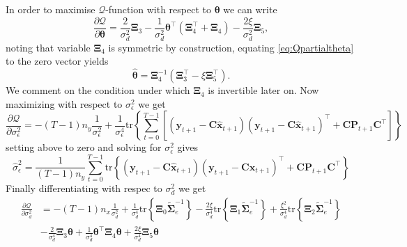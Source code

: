 \documentclass[]{article}
\begin{document}
In order to maximise $\mathcal{Q}$-function with respect to $\boldsymbol\theta$ we can write
\begin{equation}\label{eq:Qpartialtheta}
 \frac{\partial \mathcal Q}{\partial \boldsymbol\theta}=\frac{2}{\sigma_d^2}\boldsymbol\Xi_3-\frac{1}{\sigma_d^2}\boldsymbol\theta^\top(\boldsymbol\Xi_4^\top+\boldsymbol\Xi_4)-\frac{2\xi}{\sigma_d^2}\boldsymbol\Xi_5,
\end{equation}
noting that variable $\boldsymbol\Xi_4$ is symmetric by construction, equating \eqref{eq:Qpartialtheta} to the zero vector yields
\begin{equation}\label{eq:theta}
 \hat{\boldsymbol \theta}=\boldsymbol\Xi_4^{-1}\left(\boldsymbol\Xi_3^\top-\xi\boldsymbol\Xi_5^\top \right).
\end{equation}
We comment on the condition under which $\boldsymbol\Xi_4$ is invertible later on. Now maximizing with respect to $\sigma_{\epsilon}^2$ we get
\begin{equation}
  \frac{\partial \mathcal Q}{\partial \sigma_{\epsilon}^2}=-(T-1)n_y\frac{1}{\sigma_{\epsilon}^2}+\frac{1}{\sigma_{\epsilon}^4}\mathrm{tr}\left\lbrace\sum_{t=0}^{T-1}\left[ (\mathbf y_{t+1}-\mathbf C\mathbf{\hat{x}}_{t+1}) (\mathbf y_{t+1}-\mathbf C\mathbf{\hat{x}}_{t+1})^\top+\mathbf C \mathbf P_{t+1}\mathbf C^\top\right] \right\rbrace
\end{equation}
setting above to zero and solving for $\sigma_{\epsilon}^2$ gives
\begin{equation}
 \hat{\sigma}_{\epsilon}^2=\frac{1}{(T-1)n_y}\sum_{t=0}^{T-1}\mathrm{tr}\left\lbrace (\mathbf y_{t+1}-\mathbf C\mathbf{\hat{x}}_{t+1}) (\mathbf y_{t+1}-\mathbf C\mathbf{\hat{x}}_{t+1})^\top+\mathbf C \mathbf P_{t+1}\mathbf C^\top \right\rbrace
\end{equation}
Finally differentiating with respec to $\sigma_d^2$ we get
\begin{align}
 \frac{\partial \mathcal Q}{\partial \sigma_d^2}&= -(T-1)n_x\frac{1}{\sigma_d^2}+\frac{1}{\sigma_d^4}\mathrm{tr}\left\lbrace \boldsymbol\Xi_0 \tilde{\boldsymbol\Sigma}_e^{-1}\right\rbrace-\frac{2\xi}{\sigma_d^4} \mathrm{tr}\left\lbrace \boldsymbol\Xi_1 \tilde{\boldsymbol\Sigma}_e^{-1}\right\rbrace+\frac{\xi^2}{\sigma_d^4}\mathrm{tr} \left\lbrace\boldsymbol\Xi_2\tilde{\boldsymbol\Sigma}_e^{-1} \right\rbrace  \nonumber \\
&-\frac{2}{\sigma_d^4}\boldsymbol\Xi_3\boldsymbol\theta +\frac{1}{\sigma_d^4}\boldsymbol\theta^\top \boldsymbol\Xi_4\boldsymbol\theta+\frac{2\xi}{\sigma_d^4} \boldsymbol\Xi_5 \boldsymbol\theta 
\end{align}
\end{document}
